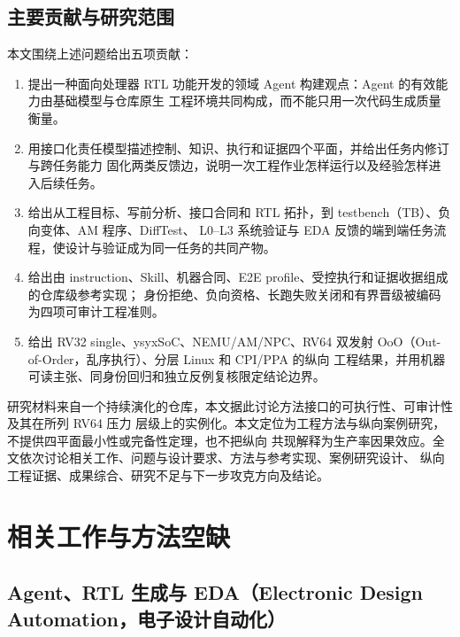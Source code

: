 \documentclass[UTF8,a4paper,zihao=-4,oneside]{ctexart}
\begin{document}
\subsection{主要贡献与研究范围}

本文围绕上述问题给出五项贡献：

\begin{enumerate}
  \item 提出一种面向处理器 RTL 功能开发的领域 Agent 构建观点：Agent 的有效能力由基础模型与仓库原生
  工程环境共同构成，而不能只用一次代码生成质量衡量。
  \item 用接口化责任模型描述控制、知识、执行和证据四个平面，并给出任务内修订与跨任务能力
  固化两类反馈边，说明一次工程作业怎样运行以及经验怎样进入后续任务。
  \item 给出从工程目标、写前分析、接口合同和 RTL 拓扑，到 testbench（TB）、负向变体、AM 程序、DiffTest、
  L0--L3 系统验证与 EDA 反馈的端到端任务流程，使设计与验证成为同一任务的共同产物。
  \item 给出由 instruction、Skill、机器合同、E2E profile、受控执行和证据收据组成的仓库级参考实现；
  身份拒绝、负向资格、长跑失败关闭和有界晋级被编码为四项可审计工程准则。
  \item 给出 RV32 single、ysyxSoC、NEMU/AM/NPC、RV64 双发射 OoO（Out-of-Order，乱序执行）、分层 Linux 和 CPI/PPA 的纵向
  工程结果，并用机器可读主张、同身份回归和独立反例复核限定结论边界。
\end{enumerate}

研究材料来自一个持续演化的仓库，本文据此讨论方法接口的可执行性、可审计性及其在所列 RV64 压力
层级上的实例化。本文定位为工程方法与纵向案例研究，不提供四平面最小性或完备性定理，也不把纵向
共现解释为生产率因果效应。全文依次讨论相关工作、问题与设计要求、方法与参考实现、案例研究设计、
纵向工程证据、成果综合、研究不足与下一步攻克方向及结论。

\section{相关工作与方法空缺}

\subsection{Agent、RTL 生成与 EDA（Electronic Design Automation，电子设计自动化）}
\end{document}
